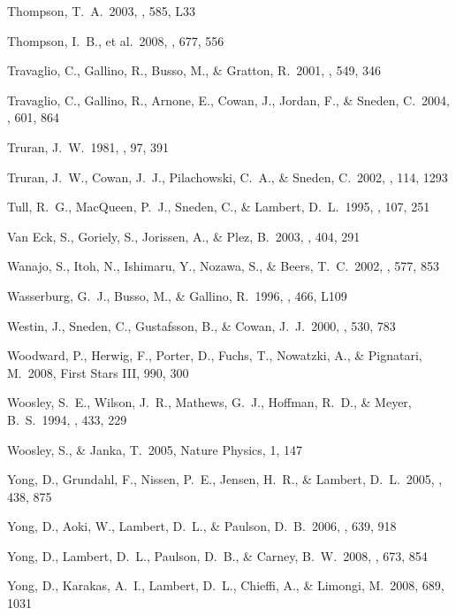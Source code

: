 \documentclass{emulateapj}
\begin{document}
\begin{thebibliography}{}
 Thompson, T.~A.\ 2003, \apjl, 585, L33

 Thompson, I.~B., et 
al.\ 2008, \apj, 677, 556 

 Travaglio, C., 
Gallino, R., Busso, M., \& Gratton, R.\ 2001, \apj, 549, 346 

 Travaglio, C., 
Gallino, R., Arnone, E., Cowan, J., Jordan, F., 
\& Sneden, C.\ 2004, \apj, 601, 864 

 Truran, J.~W.\ 1981, \aap, 97, 391 

 Truran, J.~W., Cowan,
J.~J., Pilachowski, C.~A., \& Sneden, C.\ 2002, \pasp, 114, 1293

 Tull, R.~G., MacQueen, 
P.~J., Sneden, C., \& Lambert, D.~L.\ 1995, \pasp, 107, 251 

 Van Eck, S., Goriely, S., 
Jorissen, A., \& Plez, B.\ 2003, \aap, 404, 291 

 Wanajo, S., Itoh, N., 
Ishimaru, Y., Nozawa, S., \& Beers, T.~C.\ 2002, \apj, 577, 853 

 Wasserburg, G.~J., 
Busso, M., \& Gallino, R.\ 1996, \apjl, 466, L109 

 Westin, J., Sneden, C., 
Gustafsson, B., \& Cowan, J.~J.\ 2000, \apj, 530, 783 

 Woodward, P., Herwig,
F., Porter, D., Fuchs, T., Nowatzki, A.,
\& Pignatari, M.\ 2008, First Stars III, 990, 300

 Woosley, S.~E., Wilson, 
J.~R., Mathews, G.~J., Hoffman, R.~D., 
\& Meyer, B.~S.\ 1994, \apj, 433, 229 

 Woosley, S., \& Janka, T.\ 
2005, Nature Physics, 1, 147 

 Yong, D., Grundahl, F., Nissen, P.~E., 
Jensen, H.~R., \& Lambert, D.~L.\ 2005, \aap, 438, 875 

 Yong, D., Aoki, W., 
Lambert, D.~L., \& Paulson, D.~B.\ 2006, \apj, 639, 918 

 Yong, D., Lambert, D.~L., 
Paulson, D.~B., \& Carney, B.~W.\ 2008, \apj, 673, 854 

 Yong, D., Karakas, A.~I., 
Lambert, D.~L., Chieffi, A., \& Limongi, M.\ 2008, 689, 1031 


\end{thebibliography}

\begin{center}


\clearpage
\LongTables


\vspace*{1.5in}


\end{center}
\end{document}
